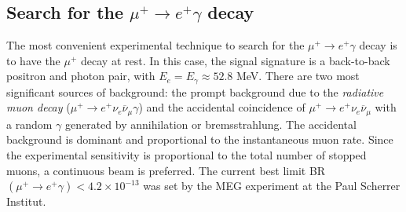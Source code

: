 \documentclass[12pt,a4paper,openright, oneside, titlepage]{book} %
\begin{document}

\subsection{Search for the $\mu^+ \rightarrow e^+ \gamma$ decay}
The most convenient experimental technique to search for the $\mu^+ \rightarrow e^+ \gamma$ decay
is to have the $\mu^+$ decay at rest. In this case, the signal  
signature is a back-to-back positron and photon pair, with $E_e=E_\gamma\approx 52.8$ MeV. 
There are two most significant sources of background: 
the prompt background due to the \textit{radiative muon decay} 
($\mu^+\rightarrow e^+ \nu_e \overline{\nu}_\mu\gamma$) 
and the accidental coincidence of $\mu^+\rightarrow e^+ \nu_e \overline{\nu}_\mu$ 
with a random $\gamma$ generated by annihilation or bremsstrahlung.
The accidental background is dominant and proportional to the instantaneous muon rate. 
Since the experimental sensitivity is proportional to the total number of stopped muons, 
a continuous beam is preferred.
The current best limit  BR$(\mu^+\rightarrow e^+\gamma)<4.2\times10^{-13}$ 
was set by the MEG experiment at the Paul Scherrer Institut\cite{MEG}.
\end{document}
